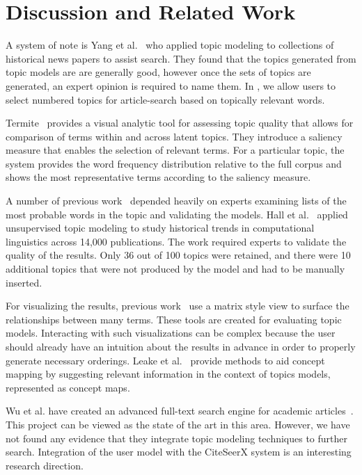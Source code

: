 
\section{Discussion and Related Work}
\label{sec:discussion}


A system of note is Yang et al.~\cite{yang2011topic} who applied topic modeling to 
collections of historical news papers to assist search. They 
found that the topics generated from topic models are 
are generally good, however once the sets of topics are 
generated, an expert opinion is required to name them. 
In \system, we allow users to select numbered topics for article-search 
based on topically relevant words.



Termite~\cite{2012-termite} provides a visual analytic tool for assessing topic
quality that allows for comparison of terms within and across latent topics.
They introduce a saliency measure that enables the selection of relevant terms.
For a particular topic, the system provides the word frequency distribution
relative to the full corpus and shows the most representative terms according
to the saliency measure.

A number of previous
work~\cite{chang2009reading,mimno2011optimizing,newman2010evaluating} depended
heavily on experts examining lists of the most probable words in the topic and
validating the models. Hall et al.~\cite{hall2008studying} applied unsupervised
topic modeling to study historical trends in computational linguistics across
14,000 publications. The work required experts  to validate the quality of the
results. Only 36 out of 100 topics were retained, and there were 10 additional
topics that were not produced by the model and had to be manually inserted.


For visualizing the results, previous work~\cite{2012-termite,bertin1983semiology,henry2007matlink} use
 a matrix style view to surface the relationships between many terms. 
These tools are created for evaluating topic models.
Interacting with such visualizations can be complex because the user should
already have an intuition about the results in advance in order to properly generate necessary
orderings.
Leake et al.~\cite{leake2003topic} provide methods to aid concept mapping by suggesting relevant information in the context of topics models, represented as concept maps. 

Wu et al. have created an advanced full-text search engine for academic articles~\cite{wu2014citeseerx}.
This project can be viewed as the state of the art in this area.
However, we have not found any evidence that they integrate topic modeling techniques to further search.
Integration of the user model with the CiteSeerX system is an interesting research direction.








